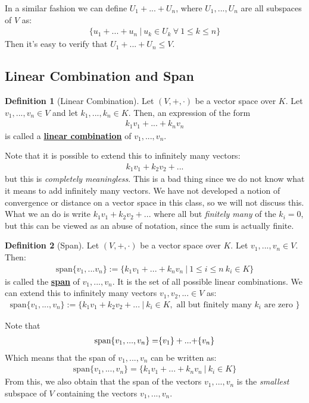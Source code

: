 \documentclass[11pt]{scrartcl}
\theoremstyle{definition}
\newtheorem{definition}{Definition}
\theoremstyle{remark}
\newcommand{\dfn}[1]{\textbf{\underline{#1}}}
\newcommand{\vsok}[0]{Let $(V, +, \cdot)$ be a vector space over $K$}
\newcommand{\vecspan}[1]{\text{span}\{ #1 \}}
\begin{document}
In a similar fashion we can define $U_1 + ... + U_n$, where $U_1, ..., U_n$ are all subspaces of $V$ as: 
\begin{align*}
		\{ u_1 + ... + u_n\ |\ u_k \in U_k\ \forall\ 1 \leq k \leq n \} 
\end{align*}
Then it's easy to verify that $U_1 + ... + U_n \leq V$. 

\subsection{Linear Combination and Span}

\begin{definition}[Linear Combination]
	\vsok. Let $v_1, ..., v_n \in V$ and let $k_1, ..., k_n \in K$. Then, an expression of the form
	\begin{align}
		k_1 v_1 + ... + k_n v_n 	
	\end{align}	
	is called a \dfn{linear combination} of $v_1, ..., v_n$. 
\end{definition}
Note that it is possible to extend this to infinitely many vectors: 
\begin{align*}
	k_1 v_1 + k_2 v_2 + ...
\end{align*}
but this is \emph{completely meaningless}. This is a bad thing since we do not know what it means to add infinitely many vectors. We have not developed a notion of convergence or distance on a vector space in this class, so we will not discuss this. What we an do is write $k_1 v_1 + k_2 v_2 + ...$ where all but \emph{finitely many} of the $k_i =0$, but this can be viewed as an abuse of notation, since the sum is actually finite. 

\begin{definition}[Span]
	\vsok. Let $v_1, ..., v_n \in V$. Then: 
	\begin{align}
		\vecspan{v_1, ...v_n} := \{ k_1 v_1 + ... + k_n v_n\ |\ 1 \leq i \leq n\ k_i \in K \} 
	\end{align}
	is called the \dfn{span} of $v_1, ..., v_n$. It is the set of all possible linear combinations. We can extend this to infinitely many vectors $v_1, v_2, ... \in V$ as: 
	\begin{align*}
		\vecspan{v_1, ..., v_n } := \{ k_1 v_1 + k_2 v_2 + ...\ |\ k_i \in K, \text{ all but finitely many $k_i$ are zero } \} 	
	\end{align*}
\end{definition}

Note that
\begin{align*}
	\text{span} \{ v_1, ..., v_n \} = \span \{ v_1 \} + ... + \span \{ v_n \} 
\end{align*}
Which means that the span of $v_1, ..., v_n$ can be written as:
\begin{align*}
	\text{span} \{ v_1, ..., v_n \} = \{ k_1 v_1 + ... + k_n v_n\ |\ k_i \in K \} 
\end{align*}
From this, we also obtain that the span of the vectors $v_1, ..., v_n$ is the \emph{smallest} subspace of $V$ containing the vectors $v_1, ..., v_n$. 
\end{document}
